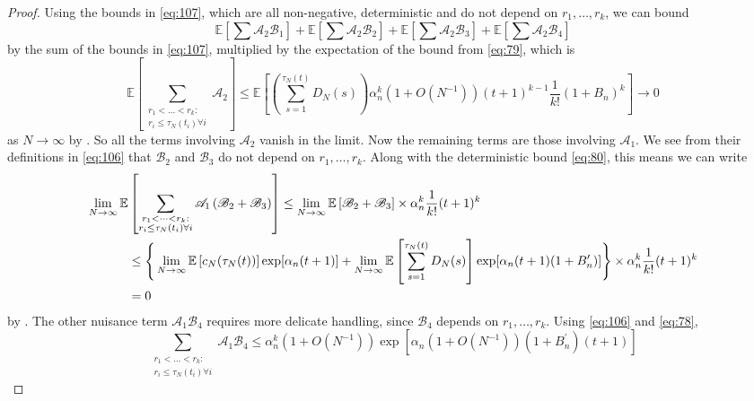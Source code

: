 \documentclass{article}
\newcommand{\E}{\mathbb{E}}
\newcommand{\1}[1]{\mathbbm{1}_{#1}}
\begin{document}
\begin{proof}
Using the bounds in \eqref{eq:107}, which are all non-negative, deterministic and do not depend on $r_1,\dots,r_k$, we can bound
\begin{equation}
\E\left[ \sum \mathscr{A}_2 \mathscr{B}_1 \right] + \E\left[ \sum \mathscr{A}_2 \mathscr{B}_2 \right] + \E\left[ \sum \mathscr{A}_2 \mathscr{B}_3 \right] + \E\left[ \sum \mathscr{A}_2 \mathscr{B}_4 \right]
\end{equation}
by the sum of the bounds in \eqref{eq:107}, multiplied by the expectation of the bound from \eqref{eq:79}, which is
\begin{equation}
\E\left[ \sum_{\substack{r_1 <\dots< r_k :\\ r_i \leq \tau_N(t_i) \forall i}} \mathscr{A}_2 \right]
\leq \E\left[ \left( \sum_{s=1}^{\tau_N(t)} D_N(s) \right) \alpha_n^k (1+O(N^{-1})) (t+1)^{k-1} \frac{1}{k!} (1+B_n)^k \right]
\longrightarrow 0
\end{equation}
as $N\to\infty$ by \citet[Equation (3.4)]{brown2021}. 
So all the terms involving $\mathscr{A}_2$ vanish in the limit.
Now the remaining terms are those involving $\mathscr{A}_1$.
We see from their definitions in \eqref{eq:106} that $\mathscr{B}_2$ and $\mathscr{B}_3$ do not depend on $r_1,\dots, r_k$. Along with the deterministic bound \eqref{eq:80}, this means we can write
\begin{align}
\lim_{N\to\infty} \E&\left[ \sum_{\substack{r_1 <\dots< r_k :\\ r_i \leq \tau_N(t_i) \forall i}} \mathscr{A}_1 \left( \mathscr{B}_2 + \mathscr{B}_3 \right) \right]
\leq \lim_{N\to\infty} \E\left[ \mathscr{B}_2 + \mathscr{B}_3 \right] \times
\alpha_n^k \frac{1}{k!} (t+1)^k \notag\\
&\leq \Bigg\{
\lim_{N\to\infty} \E\left[ c_N(\tau_N(t)) \right] \exp[ \alpha_n (t+1) ]
+ \lim_{N\to\infty} \E\left[ \sum_{s=1}^{\tau_N(t)} D_N(s) \right] 
\exp[ \alpha_n (t+1) (1+B_n^\prime) ]
\Bigg\} \times \alpha_n^k \frac{1}{k!} (t+1)^k \notag\\
&=0
\end{align}
by \citet[Equations (3.3)--(3.4)]{brown2021}.
The other nuisance term $\mathscr{A}_1 \mathscr{B}_4$ requires more delicate handling, since $\mathscr{B}_4$ depends on $r_1, \dots, r_k$. Using \eqref{eq:106} and \eqref{eq:78},
\begin{equation}
\sum_{\substack{r_1 <\dots< r_k :\\ r_i \leq \tau_N(t_i) \forall i}} \mathscr{A}_1 \mathscr{B}_4
\leq \alpha_n^k (1+O(N^{-1}))
\exp\left[\alpha_n (1+O(N^{-1})) (1 + B_n^\prime)(t+1) \right]

\end{equation}
\end{proof}
\end{document}

